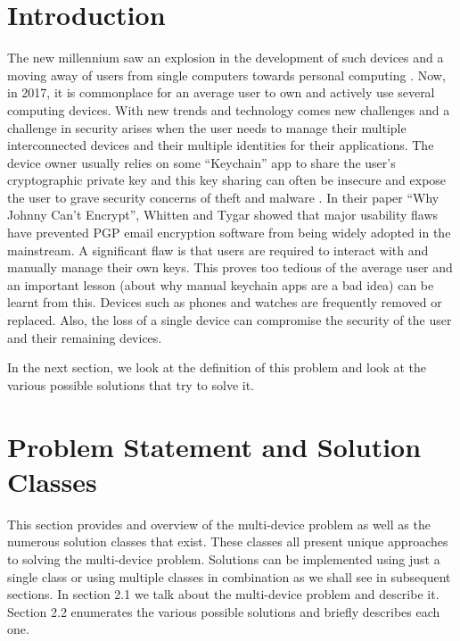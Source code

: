 \section{Introduction}

The new millennium saw an explosion in the development of such devices and a moving away of users from single computers towards personal computing \cite{Lyle2013}. Now, in 2017, it is commonplace for an average user to own and actively use several computing devices. With new trends and technology comes new challenges and a challenge in security arises when the user needs to manage their multiple interconnected devices and their multiple identities for their applications. The device owner usually relies on some ``Keychain'' app to share the user's cryptographic private key and this key sharing can often be insecure and expose the user to grave security concerns of theft and malware \cite{Atwater2016}. In their paper ``Why Johnny Can't Encrypt'', Whitten and Tygar \cite{Whitten} showed that major usability flaws have prevented PGP email encryption software from being widely adopted in the mainstream. A significant flaw is that users are required to interact with and manually manage their own keys. This proves too tedious of the average user and an important lesson (about why manual keychain apps are a bad idea) can be learnt from this. Devices such as phones and watches are frequently removed or replaced. Also, the loss of a single device can compromise the security of the user and their remaining devices.

In the next section, we look at the definition of this problem and look at the various possible solutions that try to solve it.

\section{Problem Statement and Solution Classes}
This section provides and overview of the multi-device problem as well as the numerous solution classes that exist. These classes all present unique approaches to solving the multi-device problem. Solutions can be implemented using just a single class or using multiple classes in combination as we shall see in subsequent sections.
In section 2.1 we talk about the multi-device problem and describe it. Section 2.2 enumerates the various possible solutions and briefly describes each one.

